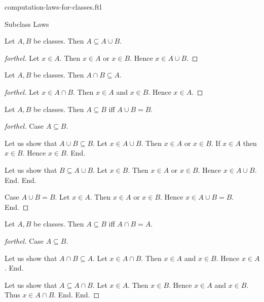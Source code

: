 \documentclass{naproche-library}
\begin{document}
\begin{smodule}[title=Computation Laws For Classes]{computation-laws-for-classes.ftl}
\begin{sfragment}{Subclass Laws}
  \begin{proposition}[forthel,id=FOUNDATIONS_02_3793981508943872]
    Let $A, B$ be classes.
    Then $A \subseteq A \cup B$.
  \end{proposition}
  \begin{proof}[forthel]
    Let $x \in A$.
    Then $x \in A$ or $x \in B$.
    Hence $x \in A \cup B$.
  \end{proof}

  \begin{proposition}[forthel,id=FOUNDATIONS_02_1591517646946304]
    Let $A, B$ be classes.
    Then $A \cap B \subseteq A$.
  \end{proposition}
  \begin{proof}[forthel]
    Let $x \in A \cap B$.
    Then $x \in A$ and $x \in B$.
    Hence $x \in A$.
  \end{proof}

  \begin{proposition}[forthel,id=FOUNDATIONS_02_6657236858306560]
    Let $A, B$ be classes.
    Then $A \subseteq B$ iff $A \cup B = B$.
  \end{proposition}
  \begin{proof}[forthel]
    Case $A \subseteq B$.

      Let us show that $A \cup B \subseteq B$.
        Let $x \in A \cup B$.
        Then $x \in A$ or $x \in B$.
        If $x \in A$ then $x \in B$.
        Hence $x \in B$.
      End.

      Let us show that $B \subseteq A \cup B$.
        Let $x \in B$.
        Then $x \in A$ or $x \in B$.
        Hence $x \in A \cup B$.
      End.
    End.

    Case $A \cup B = B$.
      Let $x \in A$.
      Then $x \in A$ or $x \in B$.
      Hence $x \in A \cup B = B$.
    End.
  \end{proof}

  \begin{proposition}[forthel,id=FOUNDATIONS_02_2356449346846720]
    Let $A, B$ be classes.
    Then $A \subseteq B$ iff $A \cap B = A$.
  \end{proposition}
  \begin{proof}[forthel]
    Case $A \subseteq B$.

      Let us show that $A \cap B \subseteq A$.
        Let $x \in A \cap B$.
        Then $x \in A$ and $x \in B$.
        Hence $x \in A$.
      End.

      Let us show that $A \subseteq A \cap B$.
        Let $x \in A$.
        Then $x \in B$.
        Hence $x \in A$ and $x \in B$.
        Thus $x \in A \cap B$.
      End.
    End.


\end{proof}
\end{sfragment}
\end{smodule}
\end{document}
